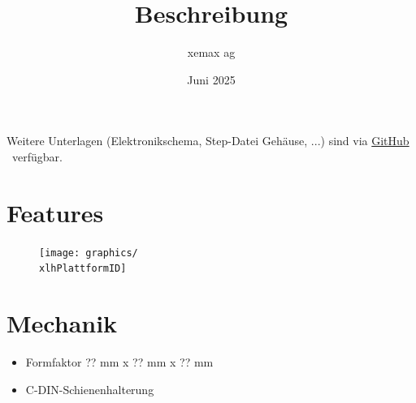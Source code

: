 \documentclass[10pt]{datasheet}
\title{Beschreibung \xlhPlattformID}
\author{xemax ag}
\date{Juni 2025}
\begin{document}
\maketitle





Weitere Unterlagen (Elektronikschema, Step-Datei Gehäuse, ...) sind via
\href{https://github.com/xemax-ag/xLH/}{GitHub \xlhPlattformID}\ verfügbar.

\section{Features}


%
%
%

\vfill\break

\begin{figure}[h]
    \centering
    \texttt{[image: graphics/\\xlhPlattformID]}
\end{figure}

\section{Mechanik}

\begin{itemize}
    \item Formfaktor ?? mm x ?? mm x ?? mm
    \item C-DIN-Schienenhalterung
\end{itemize}
\end{document}
